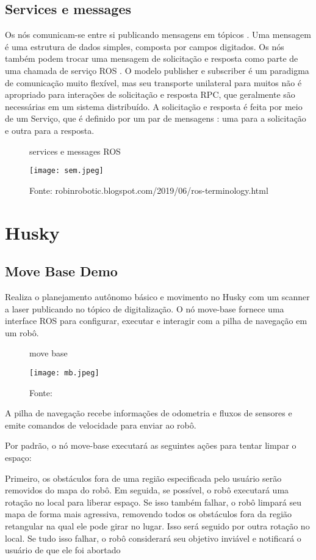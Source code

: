 \subsection{Services e messages}
Os nós comunicam-se entre si publicando mensagens em tópicos . Uma mensagem é uma estrutura de dados simples, composta por campos digitados.
Os nós também podem trocar uma mensagem de solicitação e resposta como parte de uma chamada de serviço ROS .
O modelo publisher e subscriber é um paradigma de comunicação muito flexível, mas seu transporte unilateral para muitos não é apropriado
para interações de solicitação e resposta RPC, que geralmente são necessárias em um sistema distribuído. 
A solicitação e resposta é feita por meio de um Serviço, que é definido por um par de mensagens : uma para a solicitação e outra para a resposta.
\begin{figure} [h!]	
   \centering
   \caption{services e messages ROS}
   \texttt{[image: sem.jpeg]}
   \caption*{Fonte: robinrobotic.blogspot.com/2019/06/ros-terminology.html}
   \label{fig:servicesemessages}
\end{figure}	
 \section{Husky}
 \subsection{Move Base Demo}
 Realiza o planejamento autônomo básico e movimento no Husky com um scanner a laser publicando no tópico de digitalização.
 O nó move-base fornece uma interface ROS para configurar, executar e interagir com a pilha de navegação em um robô.
 \begin{figure} [h!]	
   \centering
   \caption{move base}
   \texttt{[image: mb.jpeg]}
   \caption*{Fonte:}
   \label{fig:movebase}
\end{figure}

A pilha de navegação recebe informações de odometria e fluxos de sensores e emite comandos de velocidade para enviar ao robô.

Por padrão, o nó move-base executará as seguintes ações para tentar limpar o espaço:

Primeiro, os obstáculos fora de uma região especificada pelo usuário serão removidos do mapa do robô. Em seguida, se possível, o robô executará uma rotação no local para liberar espaço. Se isso também falhar, o robô limpará seu mapa de forma mais agressiva, removendo todos os obstáculos fora da região retangular na qual ele pode girar no lugar. Isso será seguido por outra rotação no local. Se tudo isso falhar, o robô considerará seu objetivo inviável e notificará o usuário de que ele foi abortado

